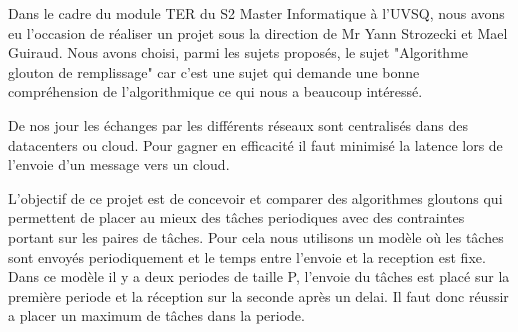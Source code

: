 \documentclass[11pt]{article}
\begin{document}
Dans le cadre du module TER du S2 Master Informatique à l’UVSQ, nous avons eu l’occasion de réaliser un projet sous la direction de Mr Yann Strozecki et Mael Guiraud.
Nous avons choisi, parmi les sujets proposés, le sujet "Algorithme glouton de remplissage" car c'est une sujet qui demande une bonne compréhension de l'algorithmique ce qui nous a beaucoup intéressé.

De nos jour les échanges par les différents réseaux sont centralisés dans des datacenters ou cloud.
Pour gagner en efficacité il faut minimisé la latence lors de l'envoie d'un message vers un cloud.

L'objectif de ce projet est de concevoir et comparer des algorithmes gloutons qui permettent de placer au mieux des tâches periodiques avec des contraintes portant sur les paires de tâches.
Pour cela nous utilisons un modèle où les tâches sont envoyés periodiquement et le temps entre l'envoie et la reception est fixe.
Dans ce modèle il y a deux periodes de taille P, l'envoie du tâches est placé sur la première periode et la réception sur la seconde après un delai.
Il faut donc réussir a placer un maximum de tâches dans la periode.
\end{document}
